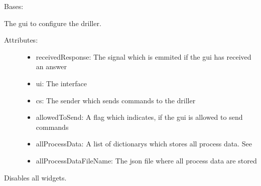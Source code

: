 \documentclass[letterpaper,10pt,english]{sphinxmanual}
\begin{document}
\begin{fulllineitems}
\label{gui:gui.Gui}
Bases: 

The gui to configure the driller.
\begin{description}
\item[{Attributes:}] \leavevmode\begin{itemize}
\item {} 
receivedResponse: The signal which is emmited if the gui has received an answer

\item {} 
ui: The interface

\item {} 
cs: The sender which sends commands to the driller

\item {} 
allowedToSend: A flag which indicates, if the gui is allowed to send commands

\item {} 
allProcessData: A list of dictionarys which stores all process data. See {\hyperref[gui:gui.Gui.loadAllProcessData]{}}

\item {} 
allProcessDataFileName: The json file where all process data are stored

\end{itemize}

\end{description}

\begin{fulllineitems}
\label{gui:gui.Gui.__init__}
\end{fulllineitems}


\begin{fulllineitems}
\label{gui:gui.Gui.closeEvent}
\end{fulllineitems}


\begin{fulllineitems}
\label{gui:gui.Gui.disableWidgets}
Disables all widgets.


\end{fulllineitems}
\end{fulllineitems}
\end{document}

